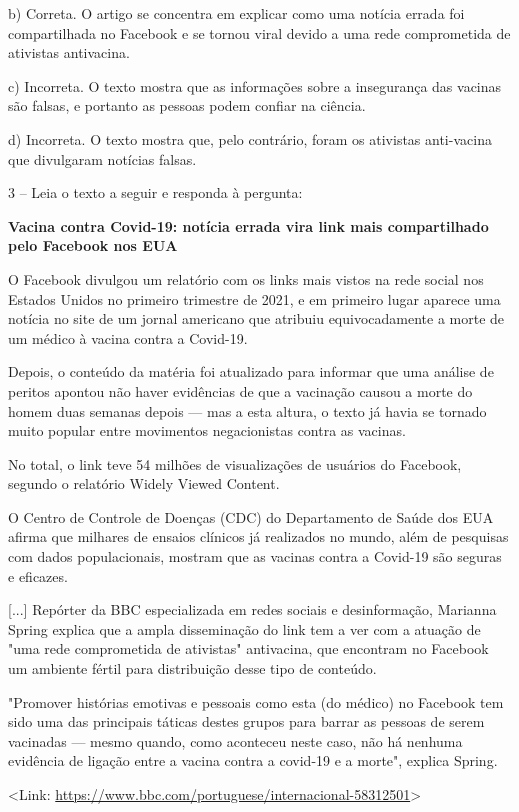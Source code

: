 b) Correta. O artigo se concentra em explicar como uma notícia errada
foi compartilhada no Facebook e se tornou viral devido a uma rede
comprometida de ativistas antivacina.

c) Incorreta. O texto mostra que as informações sobre a insegurança das
vacinas são falsas, e portanto as pessoas podem confiar na ciência.

d) Incorreta. O texto mostra que, pelo contrário, foram os ativistas
anti-vacina que divulgaram notícias falsas.

3 -- Leia o texto a seguir e responda à pergunta:

\textbf{Vacina contra Covid-19: notícia errada vira link mais
compartilhado pelo Facebook nos EUA}

O Facebook divulgou um relatório com os links mais vistos na rede social
nos Estados Unidos no primeiro trimestre de 2021, e em primeiro lugar
aparece uma notícia no site de um jornal americano que atribuiu
equivocadamente a morte de um médico à vacina contra a Covid-19.

Depois, o conteúdo da matéria foi atualizado para informar que uma
análise de peritos apontou não haver evidências de que a vacinação
causou a morte do homem duas semanas depois --- mas a esta altura, o
texto já havia se tornado muito popular entre movimentos negacionistas
contra as vacinas.

No total, o link teve 54 milhões de visualizações de usuários do
Facebook, segundo o relatório Widely Viewed Content.

O Centro de Controle de Doenças (CDC) do Departamento de Saúde dos EUA
afirma que milhares de ensaios clínicos já realizados no mundo, além de
pesquisas com dados populacionais, mostram que as vacinas contra a
Covid-19 são seguras e eficazes.

{[}...{]} Repórter da BBC especializada em redes sociais e
desinformação, Marianna Spring explica que a ampla disseminação do link
tem a ver com a atuação de "uma rede comprometida de ativistas"
antivacina, que encontram no Facebook um ambiente fértil para
distribuição desse tipo de conteúdo.

"Promover histórias emotivas e pessoais como esta (do médico) no
Facebook tem sido uma das principais táticas destes grupos para barrar
as pessoas de serem vacinadas --- mesmo quando, como aconteceu neste
caso, não há nenhuma evidência de ligação entre a vacina contra a
covid-19 e a morte", explica Spring.

\textless{}Link:
\url{https://www.bbc.com/portuguese/internacional-58312501}\textgreater{}

